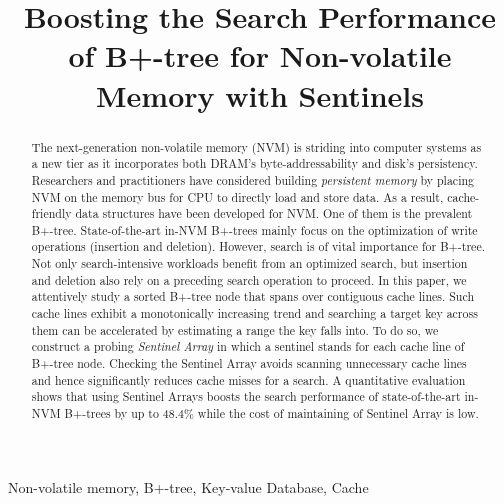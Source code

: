 \documentclass[conference]{IEEEtran}
\begin{document}
\title{Boosting the Search Performance of B+-tree for Non-volatile Memory with Sentinels}


\author{
\and
{}
}

\maketitle

\begin{abstract}
The next-generation non-volatile memory (NVM) is striding into computer systems as a new tier 
as it incorporates both DRAM's byte-addressability and disk's persistency.
Researchers and practitioners have considered building {\em persistent memory} 
by placing NVM on the memory bus for CPU to directly load and store data.
As a result, cache-friendly data structures have been developed for NVM.
One of them is the prevalent B+-tree. State-of-the-art in-NVM B+-trees
mainly focus on the optimization of write operations (insertion and deletion).
However, search is of vital importance for B+-tree.
Not only search-intensive workloads benefit from an optimized search, but
insertion and deletion also rely on a preceding search operation to proceed.
In this paper, we attentively study a sorted B+-tree node that spans over
contiguous cache lines. 
Such cache lines
exhibit a monotonically increasing trend and searching a target key across them
can be accelerated by estimating a range the key falls into.
To do so, we construct a probing {\em Sentinel Array} in which a sentinel stands for
each cache line of B+-tree node. Checking the Sentinel Array 
avoids scanning unnecessary cache lines and hence
significantly reduces cache misses for a search.
A quantitative evaluation shows that
using Sentinel Arrays boosts the search performance of state-of-the-art in-NVM B+-trees
by up to 48.4\% while the cost of maintaining of Sentinel Array is low.
\end{abstract}

\begin{IEEEkeywords}
Non-volatile memory, B+-tree, Key-value Database, Cache
\end{IEEEkeywords}







{
	

}
\end{document}

